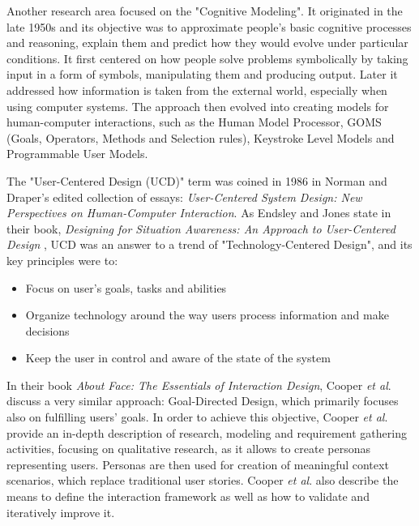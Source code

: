 \documentclass{article}
\begin{document}
Another research area focused on the "Cognitive Modeling". It originated in the late 1950s and its objective was to approximate people's basic cognitive processes and reasoning, explain them and predict how they would evolve under particular conditions. It first centered on how people solve problems symbolically by taking input in a form of symbols, manipulating them and producing output. Later it addressed how information is taken from the external world, especially when using computer systems. The approach then evolved into creating models for human-computer interactions, such as the Human Model Processor, GOMS (Goals, Operators, Methods and Selection rules), Keystroke Level Models and Programmable User Models.

The "User-Centered Design (UCD)" term was coined in 1986 in Norman and Draper's edited collection of essays: \textit{User-Centered System Design: New Perspectives on Human-Computer Interaction}. As Endsley and Jones state in their book, \textit{Designing for Situation Awareness: An Approach to User-Centered Design} \citep{endsley2016designing}, UCD was an answer to a trend of "Technology-Centered Design", and its key principles were to:
\begin{itemize}
    \item Focus on user's goals, tasks and abilities
    \item Organize technology around the way users process information and make decisions
    \item Keep the user in control and aware of the state of the system
\end{itemize}

In their book \textit{About Face: The Essentials of Interaction Design}, Cooper \textit{et al}. \citep{cooper2014face} discuss a very similar approach: Goal-Directed Design, which primarily focuses also on fulfilling users' goals. In order to achieve this objective, Cooper \textit{et al}. provide an in-depth description of research, modeling and requirement gathering activities, focusing on qualitative research, as it allows to create personas representing users. Personas are then used for creation of meaningful context scenarios, which replace traditional user stories. Cooper \textit{et al}. also describe the means to define the interaction framework as well as how to validate and iteratively improve it.
\end{document}
